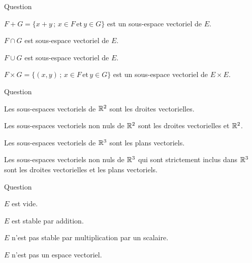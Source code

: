 \begin{multi}[multiple,feedback=
{La somme, l'intersection et le produit cartésien de sous-espaces vectoriels est un espace vectoriel. Par contre, la réunion de deux sous-espaces vectoriels n'est un espace vectoriel que si l'un des deux est inclus dans l'autre.
}]{Question}
    \item* \(F+G =\{x+y\, ; \, x\in F \,\mbox {et}\,  y \in G \}\) est un sous-espace vectoriel de \(E\).
    \item* \(F\cap G \) est sous-espace vectoriel de \(E\).
    \item \(F\cup G \) est sous-espace vectoriel de \(E\).
    \item* \(F\times G = \{(x,y) \, ; \, x \in F\,\mbox {et}\, y \in G \}\) est un sous-espace vectoriel de \(E\times E\).
\end{multi}


\begin{multi}[multiple,feedback=
{Les sous-espaces vectoriels de \(\Rr^2\) sont : \(\{(0,0)\}\), les droites vectorielles et \(\Rr^2\). Les sous-espaces vectoriels de \(\Rr^3\) sont : \(\{(0,0,0)\}\), les droites vectorielles, les plans vectoriels et \(\Rr^3\).
}]{Question}
    \item Les sous-espaces vectoriels de \(\Rr^2\) sont les droites vectorielles.
    \item* Les sous-espaces vectoriels non nuls de \(\Rr^2\) sont les droites vectorielles et \(\Rr^2\).
    \item Les sous-espaces vectoriels de \(\Rr^3\) sont les plans vectoriels.
    \item* Les sous-espaces vectoriels non nuls de \(\Rr^3\)  qui sont strictement inclus dans \(\Rr^3\) sont les droites vectorielles et les plans vectoriels.
\end{multi}


\begin{multi}[multiple,feedback=
{\(E\) n'est pas un sous-espace vectoriel de \(\Rr_2[X]\), puisque le polynôme nul n'appartient pas à \( E\).  
\(E\) n'est stable ni par addition ni par multiplication par un scalaire.
}]{Question}
    \item \(E\) est vide.
    \item \(E\) est stable par addition.
    \item* \(E\) n'est pas stable par multiplication par un scalaire.
    \item* \(E\) n'est pas un espace vectoriel.
\end{multi}


